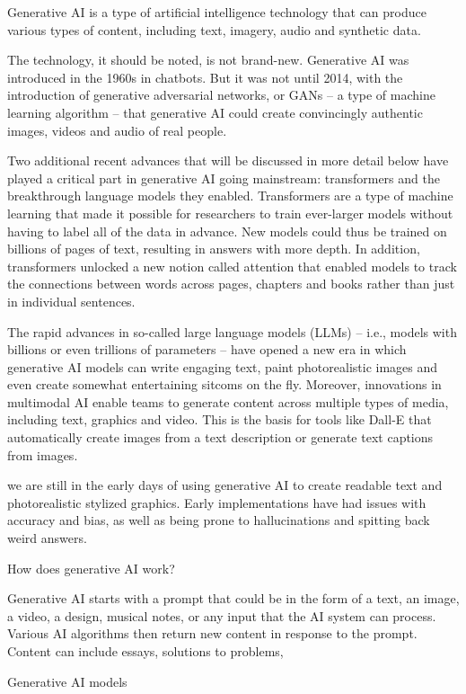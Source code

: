 Generative AI is a type of artificial intelligence technology that can produce various types of content, including text, imagery, audio and synthetic data.

The technology, it should be noted, is not brand-new. Generative AI was introduced in the 1960s in chatbots. But it was not until 2014, with the introduction of generative adversarial networks, or GANs -- a type of machine learning algorithm -- that generative AI could create convincingly authentic images, videos and audio of real people.

Two additional recent advances that will be discussed in more detail below have played a critical part in generative AI going mainstream: transformers and the breakthrough language models they enabled. Transformers are a type of machine learning that made it possible for researchers to train ever-larger models without having to label all of the data in advance. New models could thus be trained on billions of pages of text, resulting in answers with more depth. In addition, transformers unlocked a new notion called attention that enabled models to track the connections between words across pages, chapters and books rather than just in individual sentences.

The rapid advances in so-called large language models (LLMs) -- i.e., models with billions or even trillions of parameters -- have opened a new era in which generative AI models can write engaging text, paint photorealistic images and even create somewhat entertaining sitcoms on the fly. Moreover, innovations in multimodal AI enable teams to generate content across multiple types of media, including text, graphics and video. This is the basis for tools like Dall-E that automatically create images from a text description or generate text captions from images.

we are still in the early days of using generative AI to create readable text and photorealistic stylized graphics. Early implementations have had issues with accuracy and bias, as well as being prone to hallucinations and spitting back weird answers.

How does generative AI work?

Generative AI starts with a prompt that could be in the form of a text, an image, a video, a design, musical notes, or any input that the AI system can process. Various AI algorithms then return new content in response to the prompt. Content can include essays, solutions to problems,

Generative AI models

